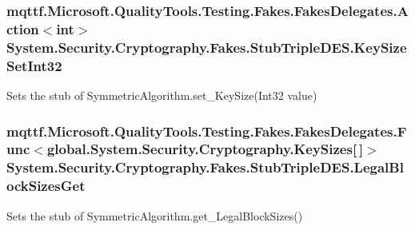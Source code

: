 \hypertarget{class_system_1_1_security_1_1_cryptography_1_1_fakes_1_1_stub_triple_d_e_s_abc3045f39477465c639b9be90ca4f118}{
\subsubsection[{Key\-Size\-Set\-Int32}]{\setlength{\rightskip}{0pt plus 5cm}mqttf.\-Microsoft.\-Quality\-Tools.\-Testing.\-Fakes.\-Fakes\-Delegates.\-Action$<$int$>$ System.\-Security.\-Cryptography.\-Fakes.\-Stub\-Triple\-D\-E\-S.\-Key\-Size\-Set\-Int32}}\label{class_system_1_1_security_1_1_cryptography_1_1_fakes_1_1_stub_triple_d_e_s_abc3045f39477465c639b9be90ca4f118}


Sets the stub of Symmetric\-Algorithm.\-set\-\_\-\-Key\-Size(\-Int32 value)

\hypertarget{class_system_1_1_security_1_1_cryptography_1_1_fakes_1_1_stub_triple_d_e_s_a9d0e4e01fe949f79ac648f392d291db1}{
\subsubsection[{Legal\-Block\-Sizes\-Get}]{\setlength{\rightskip}{0pt plus 5cm}mqttf.\-Microsoft.\-Quality\-Tools.\-Testing.\-Fakes.\-Fakes\-Delegates.\-Func$<$global.\-System.\-Security.\-Cryptography.\-Key\-Sizes\mbox{[}$\,$\mbox{]}$>$ System.\-Security.\-Cryptography.\-Fakes.\-Stub\-Triple\-D\-E\-S.\-Legal\-Block\-Sizes\-Get}}\label{class_system_1_1_security_1_1_cryptography_1_1_fakes_1_1_stub_triple_d_e_s_a9d0e4e01fe949f79ac648f392d291db1}


Sets the stub of Symmetric\-Algorithm.\-get\-\_\-\-Legal\-Block\-Sizes()

